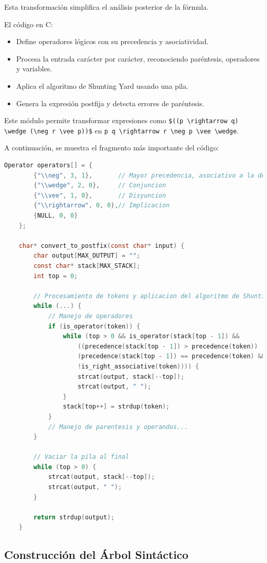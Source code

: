 \documentclass{report}
\begin{document}
	Esta transformación simplifica el análisis posterior de la fórmula.

	El código en C:
	\begin{itemize}
		\item Define operadores lógicos con su precedencia y asociatividad.
		\item Procesa la entrada carácter por carácter, reconociendo paréntesis, operadores y variables.
		\item Aplica el algoritmo de Shunting Yard usando una pila.
		\item Genera la expresión postfija y detecta errores de paréntesis.
	\end{itemize}

	Este módulo permite transformar expresiones como \verb|$((p \rightarrow q) \wedge (\neg r \vee p))$| en \verb|p q \rightarrow r \neg p \vee \wedge|.

	A continuación, se muestra el fragmento más importante del código:


	\begin{lstlisting}[language=C, caption={Fragmento clave de la conversión a notación postfija}]
	Operator operators[] = {
		{"\\neg", 3, 1},       // Mayor precedencia, asociativo a la derecha
		{"\\wedge", 2, 0},     // Conjuncion
		{"\\vee", 1, 0},       // Disyuncion
		{"\\rightarrow", 0, 0},// Implicacion
		{NULL, 0, 0}
	};

	char* convert_to_postfix(const char* input) {
		char output[MAX_OUTPUT] = "";
		const char* stack[MAX_STACK];
		int top = 0;

		// Procesamiento de tokens y aplicacion del algoritmo de Shunting Yard
		while (...) {
			// Manejo de operadores
			if (is_operator(token)) {
				while (top > 0 && is_operator(stack[top - 1]) &&
					((precedence(stack[top - 1]) > precedence(token)) ||
					(precedence(stack[top - 1]) == precedence(token) &&
					!is_right_associative(token)))) {
					strcat(output, stack[--top]);
					strcat(output, " ");
				}
				stack[top++] = strdup(token);
			}
			// Manejo de parentesis y operandos...
		}

		// Vaciar la pila al final
		while (top > 0) {
			strcat(output, stack[--top]);
			strcat(output, " ");
		}

		return strdup(output);
	}
	\end{lstlisting}
	\subsection{Construcción del Árbol Sintáctico}
\end{document}
